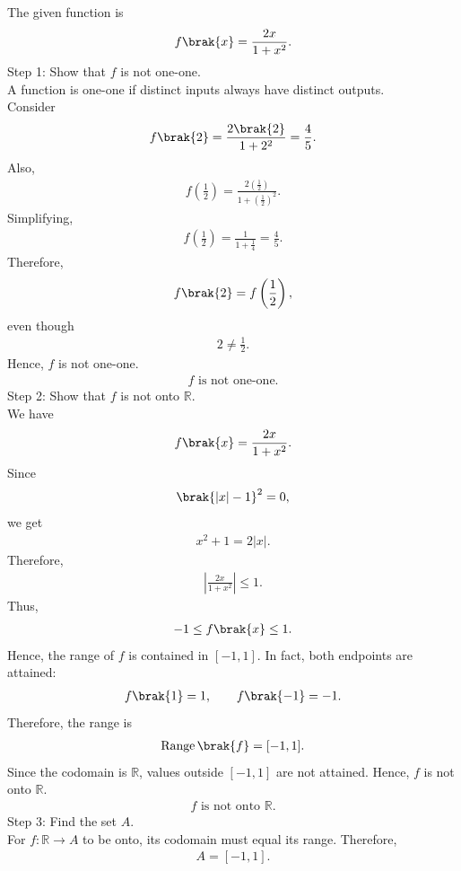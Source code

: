 \begin{enumerate}[label=\thesubsection.\arabic*, ref=\thesubsection.\theenumi]
\solution
The given function is
\begin{align}
f\brak{x}=\frac{2x}{1+x^2}.
\end{align}
{Step 1: Show that $f$ is not one-one.}
\\A function is one-one if distinct inputs always have distinct outputs.
\\Consider
\begin{align}
f\brak{2}=\frac{2\brak{2}}{1+2^2}
=\frac{4}{5}.
\end{align}
Also,
\begin{align}
f\left(\frac{1}{2}\right)
=\frac{2\left(\frac{1}{2}\right)}
{1+\left(\frac{1}{2}\right)^2}.
\end{align}
Simplifying,
\begin{align}
f\left(\frac{1}{2}\right)
=\frac{1}{1+\frac{1}{4}}
=\frac{4}{5}.
\end{align}
Therefore,
\begin{align}
f\brak{2}=f\left(\frac{1}{2}\right),
\end{align}
even though
\begin{align}
2\ne\frac{1}{2}.
\end{align}
Hence, $f$ is not one-one.
\begin{align}
f\text{ is not one-one.}
\end{align}
{Step 2: Show that $f$ is not onto $\mathbb{R}$.}
\\We have
\begin{align}
f\brak{x}=\frac{2x}{1+x^2}.
\end{align}
Since
\begin{align}
\brak{|x|-1}^2= 0,
\end{align}
we get
\begin{align}
x^2+1= 2|x|.
\end{align}
Therefore,
\begin{align}
\left|\frac{2x}{1+x^2}\right|\leq 1.
\end{align}
Thus,
\begin{align}
-1\leq f\brak{x}\leq 1.
\end{align}
Hence, the range of $f$ is contained in $[-1,1]$.
In fact, both endpoints are attained:
\begin{align}
f\brak{1}=1,\qquad f\brak{-1}=-1.
\end{align}
Therefore, the range is
\begin{align}
\operatorname{Range}\brak{f}=[-1,1].
\end{align}
Since the codomain is $\mathbb{R}$, values outside $[-1,1]$
are not attained. Hence, $f$ is not onto $\mathbb{R}$.
\begin{align}
f\text{ is not onto }\mathbb{R}.
\end{align}
{Step 3: Find the set $A$.}
\\For $f:\mathbb{R}\to A$ to be onto, its codomain must equal
its range.
Therefore,
\begin{align}
A=[-1,1].
\end{align}


\end{enumerate}
